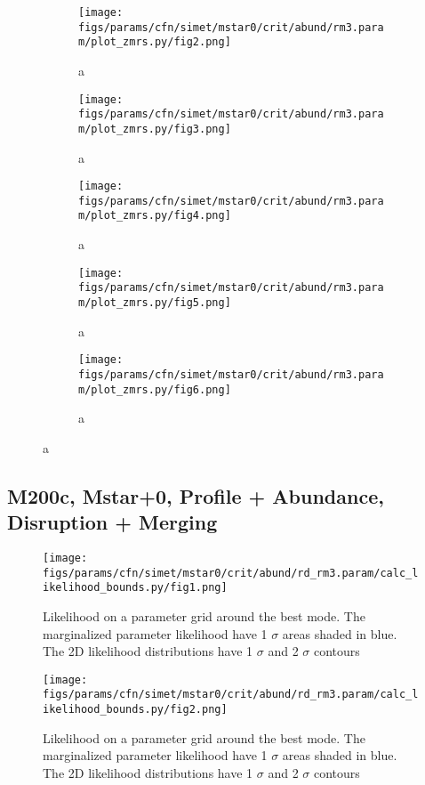 \documentclass[twocolumn]{article}
\begin{document}
\begin{figure}
  \begin{subfigure}{.5\textwidth}
    \centering\texttt{[image: figs/params/cfn/simet/mstar0/crit/abund/rm3.param/plot\_zmrs.py/fig2.png]}
    \caption{a}
  \end{subfigure}
  \begin{subfigure}{.5\textwidth}
    \centering\texttt{[image: figs/params/cfn/simet/mstar0/crit/abund/rm3.param/plot\_zmrs.py/fig3.png]}
    \caption{a}
  \end{subfigure}
  \begin{subfigure}{.5\textwidth}
    \centering\texttt{[image: figs/params/cfn/simet/mstar0/crit/abund/rm3.param/plot\_zmrs.py/fig4.png]}
    \caption{a}
  \end{subfigure}%
  \begin{subfigure}{.5\textwidth}
    \centering\texttt{[image: figs/params/cfn/simet/mstar0/crit/abund/rm3.param/plot\_zmrs.py/fig5.png]}
    \caption{a}
  \end{subfigure}
  \begin{subfigure}{.5\textwidth}
    \centering\texttt{[image: figs/params/cfn/simet/mstar0/crit/abund/rm3.param/plot\_zmrs.py/fig6.png]}
    \caption{a}
  \end{subfigure}
\end{figure}
\clearpage


\subsection{M200c, Mstar+0, Profile + Abundance, Disruption + Merging}
\begin{figure}[H]
  \center\texttt{[image: figs/params/cfn/simet/mstar0/crit/abund/rd\_rm3.param/calc\_likelihood\_bounds.py/fig1.png]}
  \caption{Likelihood on a parameter grid around the best mode. The marginalized parameter likelihood have
    1 $\sigma$ areas shaded in blue. The 2D likelihood distributions have 1 $\sigma$  and 2 $\sigma$ contours}
  \label{fig:basic_rd:likelihood}
\end{figure}

\begin{figure}[H]
  \center\texttt{[image: figs/params/cfn/simet/mstar0/crit/abund/rd\_rm3.param/calc\_likelihood\_bounds.py/fig2.png]}
  \caption{Likelihood on a parameter grid around the best mode. The marginalized parameter likelihood have
    1 $\sigma$ areas shaded in blue. The 2D likelihood distributions have 1 $\sigma$  and 2 $\sigma$ contours}
  \label{fig:basic_rd:likelihood}
\end{figure}
\end{document}
